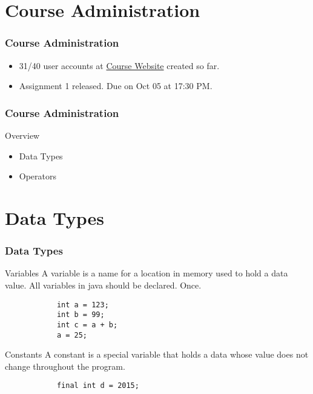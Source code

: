 \documentclass[10pt, compress]{beamer}
\begin{document}
\prepareCover

\section{Course Administration}

\begin{frame}[fragile]
	\frametitle{Course Administration}
	\begin{itemize}
		\item[] 31/40 user accounts at \href{http://www.ghorbanzade.com}{Course Website} created so far.
		\item[] Assignment 1 released. Due on Oct 05 at 17:30 PM.
	\end{itemize}
\end{frame}

\begin{frame}[fragile]
	\frametitle{Course Administration}
	\begin{block}{Overview}
		\begin{itemize}
			\item[] Data Types
			\item[] Operators
		\end{itemize}
	\end{block}
\end{frame}

\section{Data Types}

\begin{frame}[fragile]
	\frametitle{Data Types}
	\begin{block}{Variables}
		A variable is a name for a location in memory used to hold a data value. All variables in java should be declared. Once.
		\begin{verbatim}
			int a = 123;
			int b = 99;
			int c = a + b;
			a = 25;
		\end{verbatim}
	\end{block}
	\begin{block}{Constants}
		A constant is a special variable that holds a data whose value does not change throughout the program.
		\begin{verbatim}
			final int d = 2015;
		\end{verbatim}
	\end{block}
\end{frame}
\end{document}
